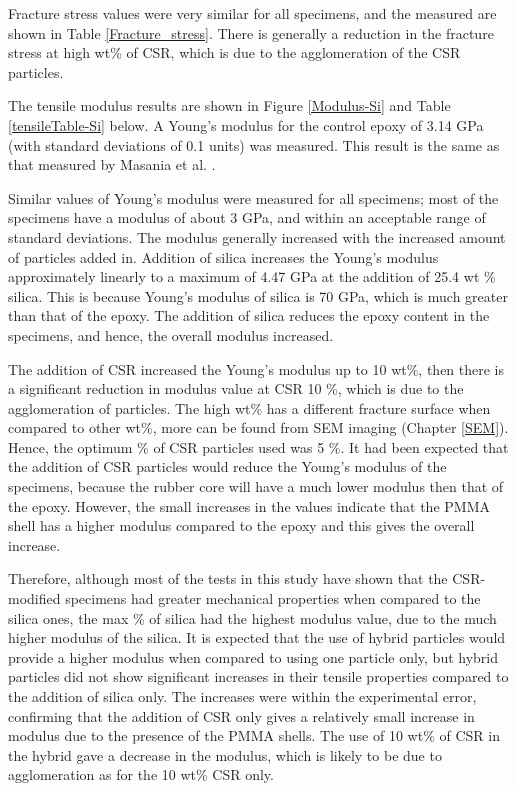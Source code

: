 \documentclass[numbers=noendperiod,chapterprefix=on]{icldt} %
\begin{document}
Fracture stress values were very similar for all specimens, and the measured  are shown in Table \ref{Fracture_stress}. %
There is generally a reduction in the fracture stress at high wt\% of CSR, which is due to the agglomeration of the CSR particles.

The tensile modulus results are shown in Figure \ref{Modulus-Si} and Table \ref{tensileTable-Si} below. 
A Young's modulus for the control epoxy of 3.14 GPa (with  standard deviations of 0.1 units) was measured. This result is the same as that measured by Masania et al. \cite{Masania2010}. 


Similar values of Young's modulus were measured for all specimens; most of the specimens have a modulus of about 3 GPa, and within an acceptable range of standard deviations. The modulus generally increased with the increased amount of particles added in. Addition of silica increases the Young's modulus approximately linearly to a maximum of 4.47 GPa at the addition of 25.4 wt \% silica. This is because Young's modulus of silica is 70 GPa, which is much greater than that of the epoxy. The addition of silica reduces the epoxy content in the specimens, and hence, the overall modulus increased.

The addition of CSR increased the Young's modulus up to 10 wt\%, then there is a significant reduction in modulus value at CSR 10 \%, which is due to the agglomeration of particles. The high wt\% has a different fracture surface when compared to other wt\%, more can be found from SEM imaging (Chapter \ref{SEM}). Hence, the optimum \% of CSR particles used was 5 \%. It had been expected that the addition of CSR particles would reduce the Young's modulus of the specimens, because the rubber core will have a much lower modulus then that of the epoxy. However, the small increases in the values indicate that the PMMA shell has a higher modulus compared to the epoxy and this gives the overall increase.

Therefore, although most of the tests in this study have shown that the CSR-modified specimens had greater mechanical properties when compared to the silica ones, the max \% of silica had the highest modulus value, due to the much higher modulus of the silica. 
It is expected that the use of hybrid particles would provide a higher modulus when compared to using one particle only, but hybrid particles did not show significant increases in their tensile properties compared to the addition of silica only.
The increases were within the experimental error, confirming that the addition of CSR only gives a relatively small increase in modulus due to the presence of the PMMA shells. The use of 10 wt\% of CSR in the hybrid gave a decrease in the modulus, which is likely to be due to agglomeration as for the 10 wt\% CSR only.
\end{document}
